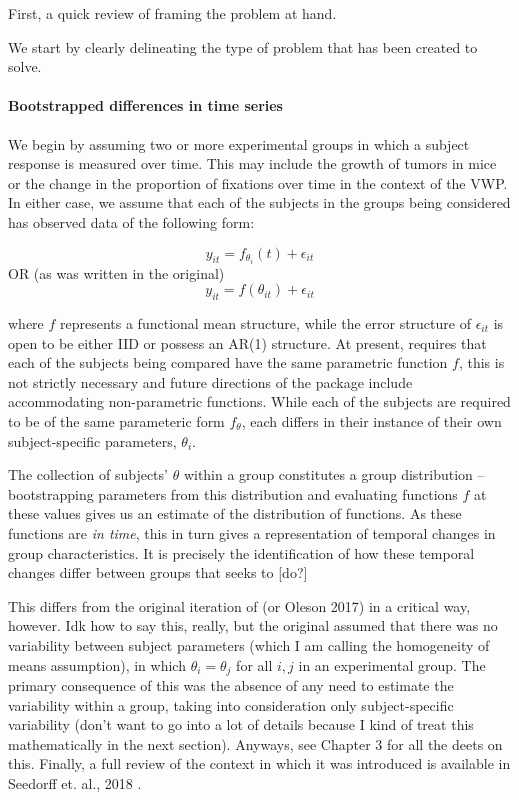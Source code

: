 First, a quick review of framing the problem at hand.

We start by clearly delineating the type of problem that  has been created to solve.

\paragraph{Bootstrapped differences in time series}

We begin by assuming two or more experimental groups in which a subject response is measured over time. This may include the growth of tumors in  mice or the change in the proportion of fixations over time in the context of the VWP. In either case, we assume that each of the subjects in the groups being considered has observed data of the following form:

\begin{equation}
y_{it} = f_{\theta_i}(t) + \epsilon_{it} 
\end{equation}
OR (as was written in the original)
\begin{equation}
y_{it} = f(\theta_{it}) + \epsilon_{it} 
\end{equation}

where $f$ represents a functional mean structure, while the error structure of $\epsilon_{it}$ is open to be either IID or possess an AR(1) structure. At present,  requires that each of the subjects being compared have the same parametric function $f$, this is not strictly necessary and future directions of the package include accommodating non-parametric functions. While each of the subjects are required to be of the same parameteric form $f_{\theta}$, each differs in their instance of their own subject-specific parameters, $\theta_i$.

The collection of subjects' $\theta$  within a group constitutes a group distribution -- bootstrapping parameters from this distribution and evaluating functions $f$ at these values gives us an estimate of the distribution of functions. As these functions are \textit{in time}, this in turn gives a representation of temporal changes in group characteristics. It is precisely the identification of how these temporal changes differ between groups that  seeks to [do?]

This differs from the original iteration of  (or Oleson 2017) in a critical way, however. Idk how to say this, really, but the original assumed that there was no variability between subject parameters (which I am calling the homogeneity of means assumption), in which $\theta_i = \theta_j$ for all $i,j$ in an experimental group. The primary consequence of this was the absence of any need to estimate the variability within a group, taking into consideration only subject-specific variability (don't want to go into a lot of details because I kind of treat this mathematically in the next section). Anyways, see Chapter 3 for all the deets on this. Finally, a full review of the context in which it was introduced is available in Seedorff et. al., 2018 \cite{seedorff2018bdots}.

